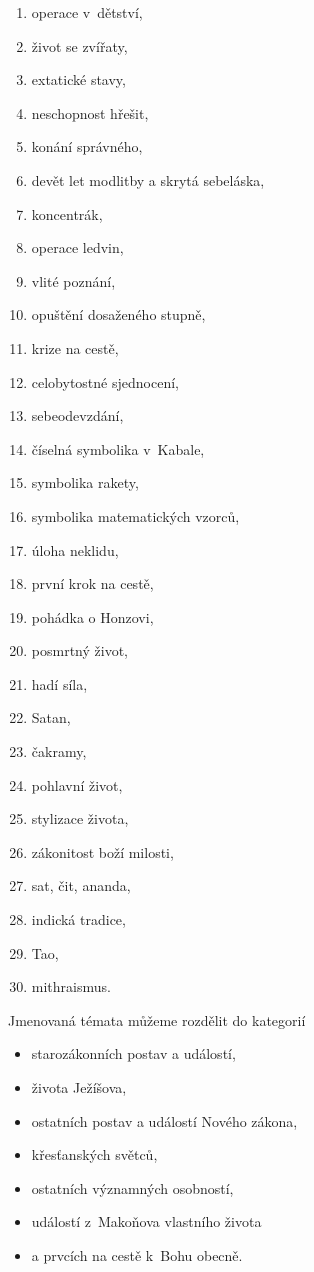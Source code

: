\begin{enumerate}
\item{operace v~dětství,}
\item{život se zvířaty,}
\item{extatické stavy,}
\item{neschopnost hřešit,}
\item{konání správného,}
\item{devět let modlitby a skrytá sebeláska,}
\item{koncentrák,}
\item{operace ledvin,}
\item{vlité poznání,}

\item{opuštění dosaženého stupně,}
\item{krize na cestě,}
\item{celobytostné sjednocení,}
\item{sebeodevzdání,}
\item{číselná symbolika v~Kabale,}
\item{symbolika rakety,}
\item{symbolika matematických vzorců,}
\item{úloha neklidu,}
\item{první krok na cestě,}
\item{pohádka o Honzovi,}
\item{posmrtný život,}
\item{hadí síla,}
\item{Satan,}
\item{čakramy,}
\item{pohlavní život,}
\item{stylizace života,}
\item{zákonitost boží milosti,}
\item{sat, čit, ananda,}
\item{indická tradice,}
\item{Tao,}
\item{mithraismus.}

\end{enumerate}

Jmenovaná témata můžeme rozdělit do kategorií
\begin{itemize}
\item{starozákonních postav a událostí,}
\item{života Ježíšova,}
\item{ostatních postav a událostí Nového zákona,}
\item{křesťanských světců,}
\item{ostatních významných osobností,}
\item{událostí z~Makoňova vlastního života}
\item{a prvcích na cestě k~Bohu obecně.}
\end{itemize}

